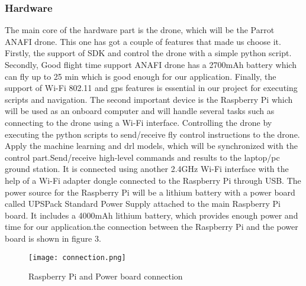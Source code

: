 \documentclass[../main.tex]{subfiles}
\begin{document}
\subsubsection{Hardware}
The main core of the hardware part is the drone, which will be the Parrot ANAFI drone. This one has got a couple of features that made us choose it. Firstly, the support of SDK and control the drone with a simple python script. Secondly, Good flight time support ANAFI drone has a 2700mAh battery which can fly up to 25 min which is good enough for our application. Finally, the support of Wi-Fi 802.11 and \gls{gps} features is essential in our project for executing scripts and navigation. The second important device is the Raspberry Pi which will be used as an onboard computer and will handle several tasks such as connecting to the drone using a Wi-Fi interface. Controlling the drone by executing the python scripts to send/receive fly control instructions to the drone. Apply the machine learning and \gls{drl} models, which will be synchronized with the control part.Send/receive high-level commands and results to the laptop/pc ground station. It is connected using another 2.4GHz Wi-Fi interface with the help of a Wi-Fi adapter dongle connected to the Raspberry Pi through USB. The power source for the Raspberry Pi will be a lithium battery with a power board called UPSPack Standard Power Supply attached to the main Raspberry Pi board. It includes a 4000mAh lithium battery, which provides enough power and time for our application.the connection between the Raspberry Pi and the power board is shown in figure 3.
\begin{figure}[H]
	\centering
	\texttt{[image: connection.png]}
	\caption{Raspberry Pi and Power board connection}\label{fig3:connection}
\end{figure}     
\end{document}
